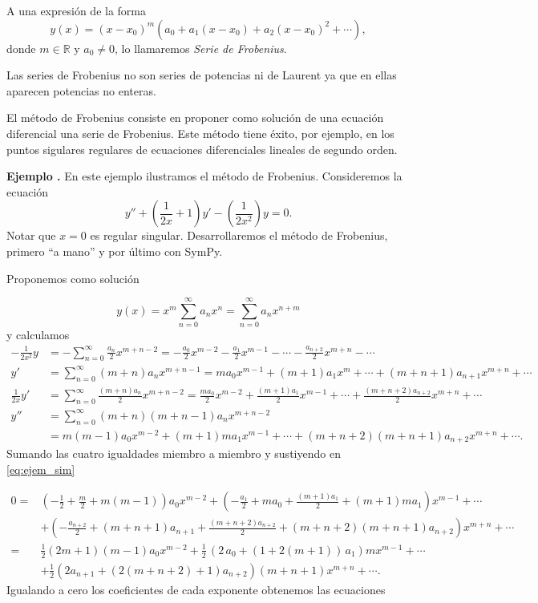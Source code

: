\documentclass{article}
\newcommand{\rr}{\mathbb{R}}
\newcounter{ejemplo_cont}
\newenvironment{ejemplo}{\noindent\textbf{Ejemplo  \arabic{ejemplo_cont}.} }{\addtocounter{ejemplo_cont}{1}}
\begin{document}
\begin{definicion} A una expresión de la forma
 \[y(x)=(x-x_0)^m(a_0+a_1(x-x_0)+a_2(x-x_0)^2+\cdots),\]
donde $m\in\rr$ y $a_0\neq 0$, lo llamaremos \emph{Serie de Frobenius}.
\end{definicion}
Las series de Frobenius no son series de potencias ni de Laurent ya que en ellas aparecen potencias no enteras.

El método de Frobenius consiste en proponer como solución de una ecuación diferencial una serie de Frobenius. Este método tiene éxito, por ejemplo, en los puntos sigulares regulares de ecuaciones diferenciales lineales de segundo orden.

\begin{ejemplo} En este ejemplo ilustramos el método de Frobenius. Consideremos la ecuación
\begin{equation}\label{eq:ejem_sim}y''+\left(\frac{1}{2x}+1\right)y'-\left(\frac{1}{2x^2}\right)y=0.
\end{equation}
Notar que $x=0$ es regular singular. Desarrollaremos el método de Frobenius, primero ``a mano'' y por último con SymPy. 

Proponemos como solución

 \[y(x)=x^m\sum_{n=0}^{\infty}a_{n}x^n=\sum_{n=0}^{\infty}a_{n}x^{n+m}\]
y calculamos
\[
    \begin{split}
     -\frac{1}{2x^2}y&=-\sum_{n=0}^{\infty}\frac{a_n}{2}x^{m+n-2}=-\frac{a_0}{2}x^{m-2}
-\frac{a_1}{2}x^{m-1}-\cdots-\frac{a_{n+2}}{2}x^{m+n}-\cdots\\
      y'&=\sum_{n=0}^{\infty}(m+n)a_{n}x^{m+n-1}=ma_0x^{m-1}+(m+1)a_1x^m+\cdots+(m+n+1)a_{n+1}x^{m+n}+\cdots\\
      \frac{1}{2x}y'&=\sum_{n=0}^{\infty}\frac{(m+n)a_{n}}{2}x^{m+n-2}=\frac{ma_0}{2}x^{m-2}+\frac{(m+1)a_1}{2}x^{m-1}+\cdots+\frac{(m+n+2)a_{n+2}}{2}x^{m+n}+\cdots\\
      y''&=\sum_{n=0}^{\infty}(m+n)(m+n-1)a_{n}x^{m+n-2}\\
&= m(m-1)a_0x^{m-2}+(m+1)ma_1x^{m-1}+\cdots+(m+n+2)(m+n+1)a_{n+2}x^{m+n}+\cdots.
    \end{split}
\]
Sumando las cuatro igualdades miembro a miembro y sustiyendo en \eqref{eq:ejem_sim}

\[
  \begin{split}
    0=& \left(-\frac{1}{2} +\frac{m}{2}+m(m-1)\right)a_0x^{m-2}  + \left(-\frac{a_1}{2}+ma_0+\frac{(m+1)a_1}{2}+ (m+1)ma_1 \right)x^{m-1}+\cdots \\
  &+\left( -\frac{a_{n+2}}{2}+(m+n+1)a_{n+1}+ \frac{(m+n+2)a_{n+2}}{2}+(m+n+2)(m+n+1)a_{n+2} \right)x^{m+n}+\cdots\\
 =&\frac12\left(2m+1\right)(m-1) a_0x^{m-2}+ \frac{1}{2} \, {\left( 2 \, a_{0} + (1+2(m+1))\, a_{1}\right)}m x^{m-1}+\cdots\\
 &+\frac12\left(   2a_{n+1}+ (2(m+n+2)+1)a_{n+2}  \right)(m+n+1)x^{m+n}+\cdots.
  \end{split}
\]
Igualando a cero los coeficientes de cada exponente obtenemos las ecuaciones
 

\end{ejemplo}
\end{document}
